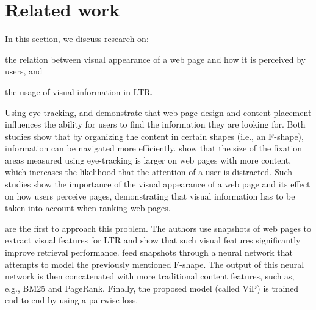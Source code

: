 
\section{Related work}\label{sec:relatedwork}
In this section, we discuss research on:
\begin{inparaenum}[(i)]
\item the relation between visual appearance of a web page and how it is perceived by users, and
\item the usage of visual information in \ac{LTR}.
\end{inparaenum} 


Using eye-tracking, \citet{nielsen2006f} and \citet{pernice2017f} demonstrate that web page design and content placement influences the ability for users to find the information they are looking for. 
Both studies show that by organizing the content in certain shapes (i.e., an F-shape), information can be  navigated more efficiently.
\citet{wang2014eye} show that the size of the fixation areas measured using eye-tracking is larger on web pages with more content, which increases the likelihood that the attention of a user is distracted.
Such studies show the importance of the visual appearance of a web page and its effect on how users perceive pages, demonstrating that visual information has to be taken into account when ranking web pages.

\citet{fan2017learning} are the first to approach this problem.
The authors use snapshots of web pages to extract visual features for LTR
and show that such visual features significantly improve retrieval performance.
\citet{fan2017learning} feed snapshots through a neural network that attempts to model the previously mentioned F-shape.
The output of this neural network is then concatenated with more traditional content features, such as, e.g., BM25 and PageRank.
Finally, the proposed model (called ViP) is trained end-to-end by using a pairwise loss.

